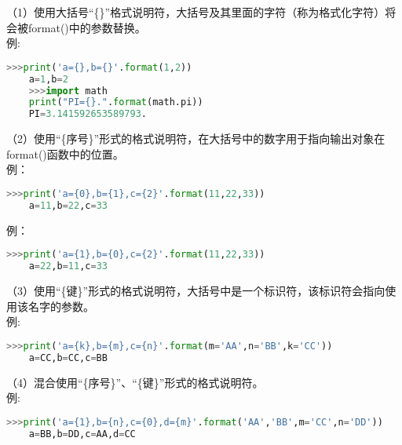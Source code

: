 \documentclass[11pt,a4paper]{article}
\begin{document}
（1）使用大括号“\{\}”格式说明符，大括号及其里面的字符（称为格式化字符）将会被format()中的参数替换。\\
例:
\begin{lstlisting}[language={Python}]
    >>>print('a={},b={}'.format(1,2))
    a=1,b=2
    >>>import math
    print("PI={}.".format(math.pi))
    PI=3.141592653589793.
\end{lstlisting}

（2）使用“\{序号\}”形式的格式说明符，在大括号中的数字用于指向输出对象在format()函数中的位置。\\
例：
\begin{lstlisting}[language={Python}]
    >>>print('a={0},b={1},c={2}'.format(11,22,33))
    a=11,b=22,c=33
\end{lstlisting}
例：
\begin{lstlisting}[language={Python}]
    >>>print('a={1},b={0},c={2}'.format(11,22,33))
    a=22,b=11,c=33
\end{lstlisting}

（3）使用“\{键\}”形式的格式说明符，大括号中是一个标识符，该标识符会指向使用该名字的参数。\\
例:
\begin{lstlisting}[language={Python}]
    >>>print('a={k},b={m},c={n}'.format(m='AA',n='BB',k='CC'))
    a=CC,b=CC,c=BB
\end{lstlisting}

（4）混合使用“\{序号\}”、“\{键\}”形式的格式说明符。\\
例:
\begin{lstlisting}[language={Python}]
    >>>print('a={1},b={n},c={0},d={m}'.format('AA','BB',m='CC',n='DD'))
    a=BB,b=DD,c=AA,d=CC
\end{lstlisting}
\end{document}
